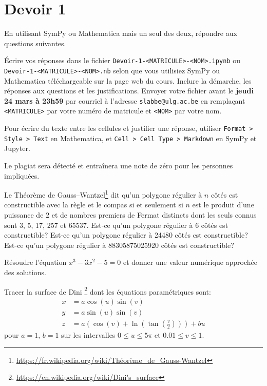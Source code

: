 



\section*{Devoir 1}

En utilisant SymPy ou Mathematica mais un seul des deux, répondre aux
questions suivantes.

Écrire vos réponses dans le fichier \texttt{Devoir-1-<MATRICULE>-<NOM>.ipynb}
ou\\ \texttt{Devoir-1-<MATRICULE>-<NOM>.nb} selon que vous utilisiez SymPy ou
Mathematica téléchargeable sur la page web du cours. Inclure la démarche, les
réponses aux questions et les justifications. Envoyer votre fichier avant le
\textbf{jeudi 24 mars à 23h59} par courriel à l'adresse
\texttt{slabbe@ulg.ac.be} en remplaçant \texttt{<MATRICULE>} par votre numéro
de matricule et \texttt{<NOM>} par votre nom.

Pour écrire du texte entre les cellules et justifier une réponse, utiliser
\texttt{Format > Style > Text} en Mathematica, et \texttt{Cell > Cell Type >
Markdown} en SymPy et Jupyter.

Le plagiat sera détecté et entraînera une note de zéro pour les personnes
impliquées.

\begin{question}
Le Théorème de
Gauss--Wantzel\footnote{\url{https://fr.wikipedia.org/wiki/Théorème_de_Gauss-Wantzel}} dit qu'un polygone régulier à $n$ côtés est
constructible avec la règle et le compas si et seulement si $n$ est le produit
d'une puissance de $2$ et de nombres premiers de Fermat distincts dont les seuls
connus sont 3, 5, 17, 257 et 65537.
Est-ce qu'un polygone régulier à 6 côtés est constructible?
Est-ce qu'un polygone régulier à 24480 côtés est constructible?
Est-ce qu'un polygone régulier à 88305875025920 côtés est constructible?
\end{question}

\begin{question}
Résoudre l'équation $x^3-3x^2-5=0$ et donner une valeur numérique approchée des
solutions.
\end{question}

\begin{question}
Tracer la surface de Dini 
\footnote{\url{https://en.wikipedia.org/wiki/Dini's_surface}}
dont les équations paramétriques sont:
\begin{align*}
    x&=a\cos\left(u\right)\sin\left(v\right)\\
    y&=a\sin\left(u\right)\sin\left(v\right)\\
    z&=a\left(\cos\left(v\right)+\ln\left(\tan\left(\frac{v}{2}\right)\right)\right)+bu 
\end{align*}
pour $a=1$, $b=1$ sur les intervalles $0\leq u \leq 5\pi$ et $0.01 \leq v\leq
1$.
\end{question}


